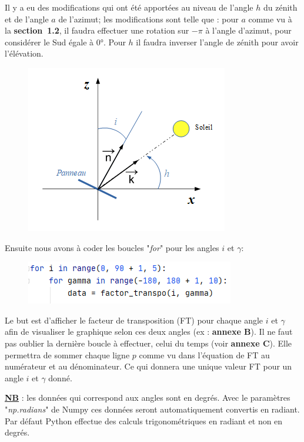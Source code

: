 \documentclass[12pt,a4paper,openright]{report}
\begin{document}
Il y a eu des modifications qui ont été apportées au niveau de l'angle $h$ du zénith et de l'angle $a$ de l'azimut; les modifications sont telle que : pour $a$ comme vu à la \textbf{section~1.2}, il faudra effectuer une rotation sur $-\pi$ à l'angle d'azimut, pour considérer le Sud égale à 0°. Pour $h$ il faudra inverser l'angle de zénith pour avoir l'élévation.
\begin{figure}[h!]
\begin{center}
\includegraphics[scale=0.6]{coursesolaire1}
\end{center}
\end{figure}

\noindent Ensuite nous avons à coder les boucles "\textit{for}" pour les angles $i$ et $\gamma$:

\begin{figure}[h!]
\includegraphics[scale=0.7]{bouclefor}
\end{figure}

 Le but est d'afficher le facteur de transposition (FT) pour chaque angle $i$ et $\gamma$ afin de visualiser le graphique selon ces deux angles (ex : \textbf{annexe B}). Il ne faut pas oublier la dernière boucle à effectuer, celui du temps (voir \textbf{annexe C}). Elle permettra de sommer chaque ligne $p$ comme vu dans l'équation de FT au numérateur et au dénominateur. Ce qui donnera une unique valeur FT pour un angle $i$ et $\gamma$ donné.

\textbf{\underline{NB}} : les données qui correspond aux angles sont en degrés. Avec le paramètres "\textit{np.radians}" de Numpy ces données seront automatiquement convertis en radiant. Par défaut Python effectue des calculs trigonométriques en radiant et non en degrés.
\end{document}
